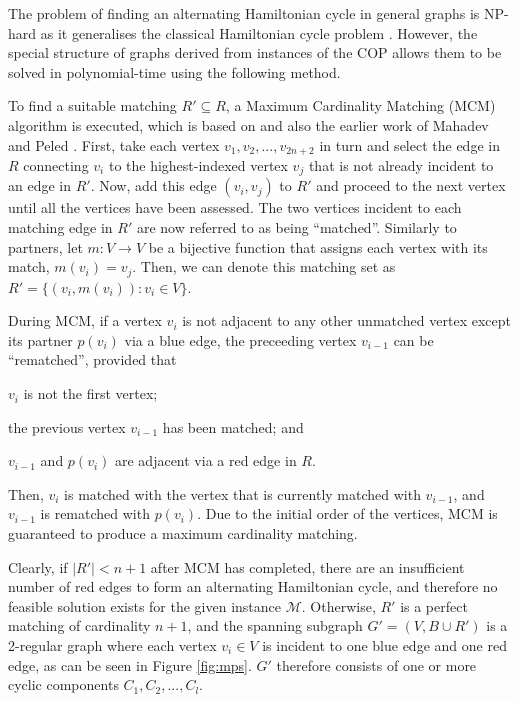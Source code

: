 \documentclass[runningheads]{llncs}
\begin{document}
The problem of finding an alternating Hamiltonian cycle in general graphs is NP-hard as it generalises the classical Hamiltonian cycle problem \cite{haggkvist1977}. However, the special structure of graphs derived from instances of the COP allows them to be solved in polynomial-time using the following method.

To find a suitable matching $R' \subseteq R$, a Maximum Cardinality Matching (MCM) algorithm is executed, which is based on \cite{becker2010} and also the earlier work of Mahadev and Peled \cite{mahadev1994}. First, take each vertex $v_1, v_2,..., v_{2n+2}$ in turn and select the edge in $R$ connecting $v_i$ to the highest-indexed vertex $v_j$ that is not already incident to an edge in $R'$. Now, add this edge $(v_i, v_j)$ to $R'$ and proceed to the next vertex until all the vertices have been assessed. The two vertices incident to each matching edge in $R'$ are now referred to as being ``matched''. Similarly to partners, let $m : V \to V$ be a bijective function that assigns each vertex with its match, $m(v_i) = v_j$. Then, we can denote this matching set as $R' =\{(v_i, m(v_i)) : v_i \in V\}$. 

During MCM, if a vertex $v_i$ is not adjacent to any other unmatched vertex except its partner $p(v_i)$ via a blue edge, the preceeding vertex $v_{i-1}$ can be ``rematched'', provided that 
\begin{enumerate*}[label={(\alph*)}]
	\item $v_i$ is not the first vertex; 
	\item the previous vertex $v_{i-1}$ has been matched; and
	\item $v_{i-1}$ and $p(v_i)$ are adjacent via a red edge in $R$.
\end{enumerate*}
Then, $v_i$ is matched with the vertex that is currently matched with $v_{i-1}$, and $v_{i-1}$ is rematched with $p(v_i)$. Due to the initial order of the vertices, MCM is guaranteed to produce a maximum cardinality matching.

Clearly, if $|R'| < n+1$ after MCM has completed, there are an insufficient number of red edges to form an alternating Hamiltonian cycle, and therefore no feasible solution exists for the given instance $\mathcal{M}$. Otherwise, $R'$ is a perfect matching of cardinality $n+1$, and the spanning subgraph $G'=(V, B \cup R')$ is a 2-regular graph where each vertex $v_i \in V$ is incident to one blue edge and one red edge, as can be seen in Figure \ref{fig:mps}. $G'$ therefore consists of one or more cyclic components $C_1, C_2, ..., C_l$. 
\end{document}

